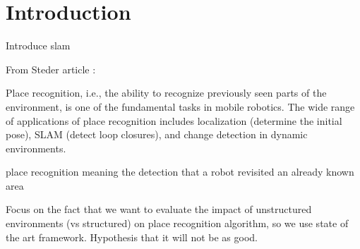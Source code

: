 \section{Introduction}
\label{sec:chap_slam_intro}

Introduce \gls*{slam}


From Steder article : 

Place recognition, i.e., the ability to recognize previously seen parts of the environment, is one of the fundamental tasks in mobile robotics. The wide range of applications of place recognition includes localization (determine the initial pose), SLAM (detect loop closures), and change detection in dynamic environments.

place recognition meaning the detection that a robot revisited an already known area

Focus on the fact that we want to evaluate the impact of unstructured environments (vs structured) on place recognition algorithm, so we use state of the art framework. Hypothesis that it will not be as good.
